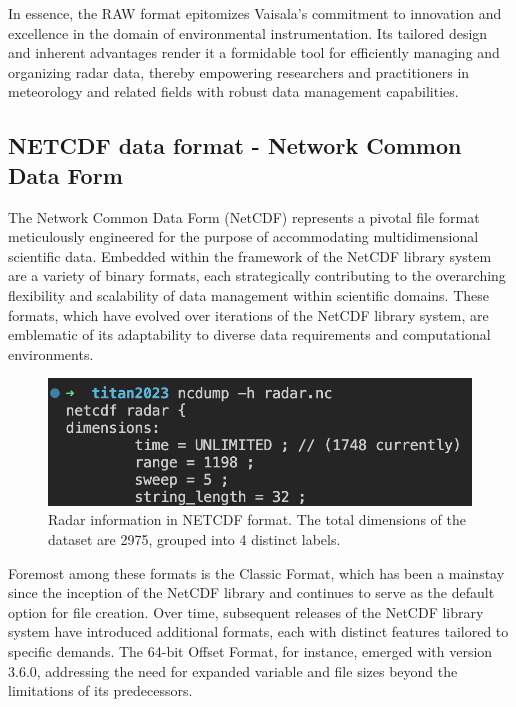 In essence, the RAW format epitomizes Vaisala's commitment to innovation and
excellence in the domain of environmental instrumentation. Its tailored design
and inherent advantages render it a formidable tool for efficiently managing and
organizing radar data, thereby empowering researchers and practitioners in
meteorology and related fields with robust data management capabilities.


\subsection{NETCDF data format - Network Common Data Form}
The Network Common Data Form (NetCDF) \cite{netcdf} represents a pivotal file
format meticulously engineered for the purpose of accommodating multidimensional
scientific data. Embedded within the framework of the NetCDF library system are
a variety of binary formats, each strategically contributing to the overarching
flexibility and scalability of data management within scientific domains. These
formats, which have evolved over iterations of the NetCDF library system, are
emblematic of its adaptability to diverse data requirements and computational
environments.

\begin{figure}[H]
    \centering
    \includegraphics[width=1\linewidth]{Images/ncdump.png}
    \vspace{1em}
    \caption{Radar information in NETCDF format. The total dimensions of the dataset are 2975, grouped into 4 distinct labels.}
    \label{fig:enter-label}
\end{figure}


Foremost among these formats is the Classic Format, which has been a mainstay
since the inception of the NetCDF library and continues to serve as the default
option for file creation. Over time, subsequent releases of the NetCDF library
system have introduced additional formats, each with distinct features tailored
to specific demands. The 64-bit Offset Format, for instance, emerged with
version 3.6.0, addressing the need for expanded variable and file sizes beyond
the limitations of its predecessors.

